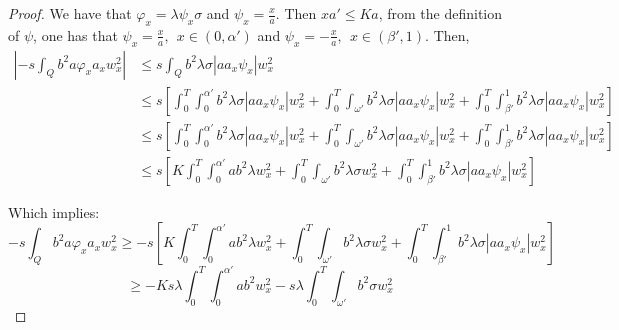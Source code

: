 \documentclass[11pt,oneside,a4papper]{osajnl}
\begin{document}
\begin{proof} We have that 
	$\varphi_{x}=\lambda \psi_x \sigma$ and $\psi_x=\frac{x}{a}$. Then $xa'\leq Ka$, from the definition of $\psi$, one has that $\psi_x=\frac{x}{a}, \ \  x\in (0,\alpha')$ and $\psi_x=-\frac{x}{a}, \ \  x\in (\beta',1).$
	Then,
    \begin{equation}
    \begin{split}
    \left| -s \int_Q b^2 a \varphi_x a_x w_x^2  \right| &\leq s\int_Q b^2 \lambda \sigma |a a_x \psi_x|  w_x^2 \\
    &\leq s\left[\int_0^T \int_0^{\alpha'} b^2 \lambda \sigma|a a_x \psi_x| w_x^2 +  \int_0^T\int_{\omega'} b^2 \lambda \sigma|a a_x \psi_x|  w_x^2 
		+\int_0^T \int_{\beta'}^1 b^2 \lambda \sigma|a a_x \psi_x|  w_x^2\right] \\
        &\leq s\left[\int_0^T \int_0^{\alpha'} b^2 \lambda \sigma|a a_x \psi_x| w_x^2 +  \int_0^T\int_{\omega'} b^2 \lambda \sigma|a a_x \psi_x|  w_x^2 + \int_0^T \int_{\beta'}^1 b^2 \lambda \sigma|a a_x \psi_x|  w_x^2\right]\\
		&\leq s\left[K\int_0^T \int_0^{\alpha'} ab^2 \lambda  w_x^2 +  \int_0^T\int_{\omega'} b^2 \lambda \sigma w_x^2 + \int_0^T \int_{\beta'}^1 b^2 \lambda \sigma|a a_x \psi_x|  w_x^2\right]
    \end{split}
    \end{equation}
    
	Which implies:
	$$
	-s \int_Q b^2 a \varphi_x a_x w_x^2  \geq -s\left[K\int_0^T \int_0^{\alpha'} ab^2 \lambda  w_x^2 +  \int_0^T\int_{\omega'} b^2 \lambda \sigma w_x^2 + \int_0^T \int_{\beta'}^1 b^2 \lambda \sigma|a a_x \psi_x|  w_x^2\right]
	$$
	$$
  \geq -Ks\lambda \int_0^T \int_0^{\alpha'} ab^2   w_x^2 -  s\lambda\int_0^T\int_{\omega'} b^2  \sigma w_x^2
	$$
\end{proof}
\end{document}
